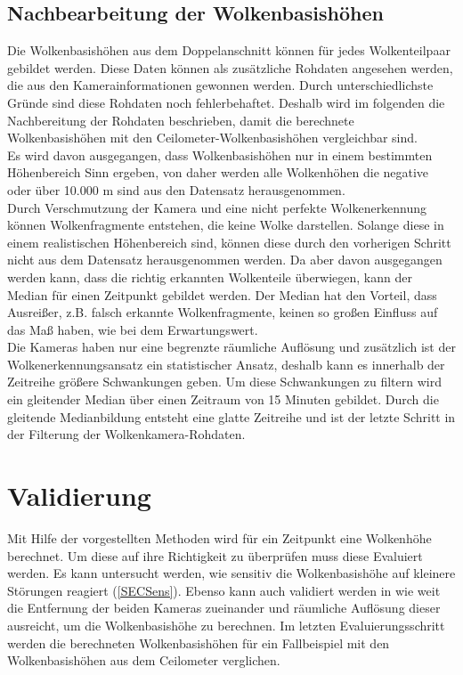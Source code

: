 \documentclass[a4paper,11pt,twoside,german]{article}
\begin{document}
\subsection{Nachbearbeitung der Wolkenbasishöhen}
\label{SECHeightPost}
Die Wolkenbasishöhen aus dem Doppelanschnitt können für jedes Wolkenteilpaar gebildet werden. Diese Daten können als zusätzliche Rohdaten angesehen werden, die aus den Kamerainformationen gewonnen werden. Durch unterschiedlichste Gründe sind diese Rohdaten noch fehlerbehaftet. Deshalb wird im folgenden die Nachbereitung der Rohdaten beschrieben, damit die berechnete Wolkenbasishöhen mit den Ceilometer-Wolkenbasishöhen vergleichbar sind.\\
Es wird davon ausgegangen, dass Wolkenbasishöhen nur in einem bestimmten Höhenbereich Sinn ergeben, von daher werden alle Wolkenhöhen die negative oder über 10.000 m sind aus den Datensatz herausgenommen.\\
Durch Verschmutzung der Kamera und eine nicht perfekte Wolkenerkennung können Wolkenfragmente entstehen, die keine Wolke darstellen. Solange diese in einem realistischen Höhenbereich sind, können diese durch den vorherigen Schritt nicht aus dem Datensatz herausgenommen werden. Da aber davon ausgegangen werden kann, dass die richtig erkannten Wolkenteile überwiegen, kann der Median für einen Zeitpunkt gebildet werden. Der Median hat den Vorteil, dass Ausreißer, z.B. falsch erkannte Wolkenfragmente, keinen so großen Einfluss auf das Maß haben, wie bei dem Erwartungswert.\\
Die Kameras haben nur eine begrenzte räumliche Auflösung und zusätzlich ist der Wolkenerkennungsansatz ein statistischer Ansatz, deshalb kann es innerhalb der Zeitreihe größere Schwankungen geben. Um diese Schwankungen zu filtern wird ein gleitender Median über einen Zeitraum von 15 Minuten gebildet. Durch die gleitende Medianbildung entsteht eine glatte Zeitreihe und ist der letzte Schritt in der Filterung der Wolkenkamera-Rohdaten.\\


\section{Validierung}
Mit Hilfe der vorgestellten Methoden wird für ein Zeitpunkt eine Wolkenhöhe berechnet. Um diese auf ihre Richtigkeit zu überprüfen muss diese Evaluiert werden. Es kann untersucht werden, wie sensitiv die Wolkenbasishöhe auf kleinere Störungen reagiert (\ref{SECSens}). Ebenso kann auch validiert werden in wie weit die Entfernung der beiden Kameras zueinander und räumliche Auflösung dieser ausreicht, um die Wolkenbasishöhe zu berechnen. Im letzten Evaluierungsschritt werden die berechneten Wolkenbasishöhen für ein Fallbeispiel mit den Wolkenbasishöhen aus dem Ceilometer verglichen.
\end{document}
